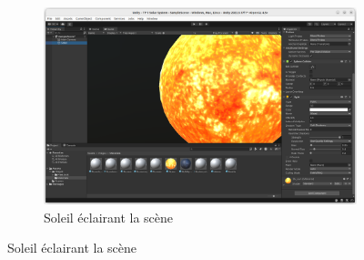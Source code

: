 \documentclass[a4paper,10pt]{article}
\begin{document}
\begin{figure}[h]
	\begin{subfigure}{\textwidth}
		\begin{center}
			\includegraphics[scale=.30]{fig/config-soleil}
			\caption{Soleil éclairant la scène}
			\label{fig:config-soleil}
		\end{center}
	\end{subfigure}
\end{figure}
\fi 
\end{document}
